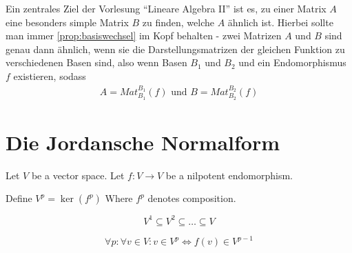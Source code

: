 \documentclass{report}
\newcommand*{\newpar}{\par\vspace{\baselineskip}\noindent}
\begin{document}
%
\newpar
%
Ein zentrales Ziel der Vorlesung ``Lineare Algebra II'' ist es, zu einer Matrix $A$ eine besonders simple Matrix $B$ zu finden, welche $A$ ähnlich ist. Hierbei sollte man immer \ref{prop:basiswechsel} im Kopf behalten - zwei Matrizen $A$ und $B$ sind genau dann ähnlich, wenn sie die Darstellungsmatrizen der gleichen Funktion zu verschiedenen Basen sind, also wenn Basen $B_1$ und $B_2$ und ein Endomorphismus $f$ existieren, sodass
\begin{align*}
 A = Mat_{B_1}^{B_1}(f) \text{ und } B = Mat_{B_2}^{B_2}(f)
\end{align*}
%
%
%
\chapter{Die Jordansche Normalform}
Let $V$ be a vector space. Let $f: V \to V$ be a nilpotent endomorphism.
\newpar
Define
$
V^p = \ker(f^p)
$
Where $f^p$ denotes composition.
\begin{lemma}
\begin{equation*}
 V^1 \subseteq V^2 \subseteq \hdots \subseteq V
\end{equation*}

\end{lemma}
\begin{lemma}
\begin{equation*}
 \forall p : \forall v \in V : v \in V^p \Leftrightarrow f(v) \in V^{p-1}
\end{equation*}
\end{lemma}
\end{document}
